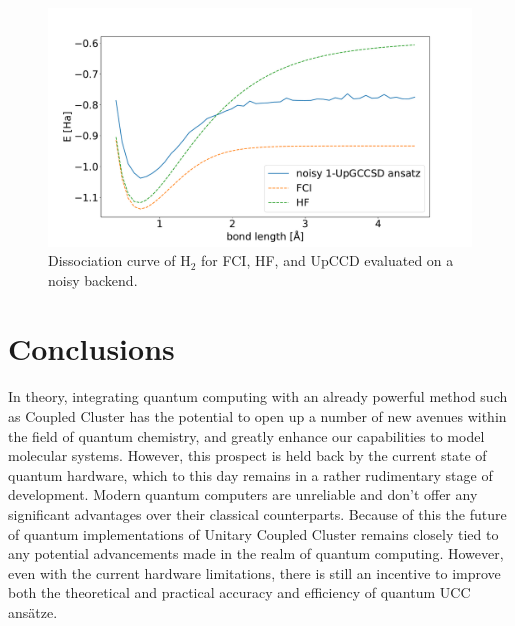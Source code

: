 \documentclass[twoside,twocolumn,9pt]{article}
\begin{document}
{\begin{center}
  \begin{figure}[h]
      \includegraphics[width=\linewidth]{QC_UCC_HH_noisy.pdf}
      \caption{Dissociation curve of $\text{H}_2$ for FCI, HF, and UpCCD evaluated on a noisy backend.}
      \label{fig:H2_noisy} 
  \end{figure}
\end{center}

\section{Conclusions}

In theory, integrating quantum computing with an already powerful method such as Coupled Cluster has the potential to open up a number of new avenues within the field of quantum chemistry, and greatly enhance our capabilities to model molecular systems. However, this prospect is held back by the current state of quantum hardware, which to this day remains in a rather rudimentary stage of development. Modern quantum computers are unreliable and don't offer any significant advantages over their classical counterparts. Because of this the future of quantum implementations of Unitary Coupled Cluster remains closely tied to any potential advancements made in the realm of quantum computing. However, even with the current hardware limitations, there is still an incentive to improve both the theoretical and practical accuracy and efficiency of quantum UCC ansätze.

}
\end{document}
